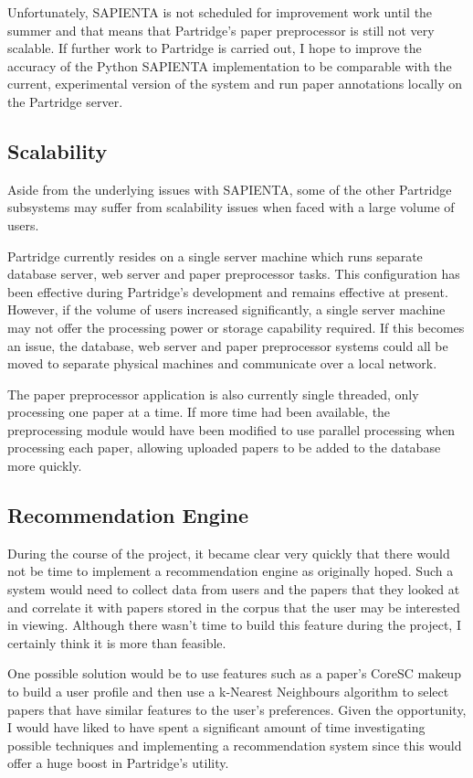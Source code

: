 Unfortunately, SAPIENTA is not scheduled for improvement work until the summer
and that means that Partridge's paper preprocessor is still not very
scalable. If further work to Partridge is carried out, I hope to improve the
accuracy of the Python SAPIENTA implementation to be comparable with the
current, experimental version of the system and run paper annotations locally
on the Partridge server.

\subsection{ Scalability }

Aside from the underlying issues with SAPIENTA, some of the other Partridge
subsystems may suffer from scalability issues when faced with a large volume of
users. 

Partridge currently resides on a single server machine which runs separate
database server, web server and paper preprocessor tasks. This configuration
has been effective during Partridge's development and remains effective at
present. However, if the volume of users increased significantly, a single
server machine may not offer the processing power or storage capability
required. If this becomes an issue, the database, web server and paper
preprocessor systems could all be moved to separate physical machines and
communicate over a local network.

The paper preprocessor application is also currently single threaded, only
processing one paper at a time. If more time had been available, the
preprocessing module would have been modified to use parallel processing when
processing each paper, allowing uploaded papers to be added to the database more
quickly.

\subsection{ Recommendation Engine}

During the course of the project, it became clear very quickly that there would
not be time to implement a recommendation engine as originally hoped. Such a
system would need to collect data from users and the papers that they looked at
and correlate it with papers stored in the corpus that the user may be
interested in viewing. Although there wasn't time to build this feature during
the project, I certainly think it is more than feasible. 

One possible solution would be to use features such as a paper's CoreSC makeup
to build a user profile and then use a k-Nearest Neighbours algorithm to select
papers that have similar features to the user's preferences. Given the
opportunity, I would have liked to have spent a significant amount of time
investigating possible techniques and implementing a recommendation system
since this would offer a huge boost in Partridge's utility.


